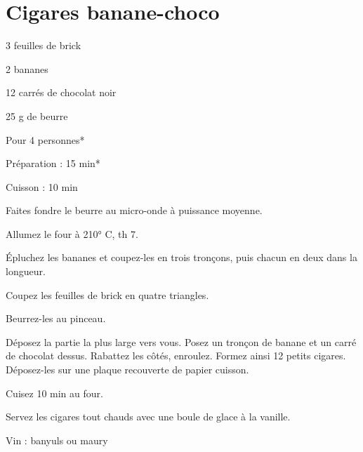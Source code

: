\section{Cigares banane-choco}

\begin{ingredients}
\item 3 feuilles de brick
\item 2 bananes
\item 12 carrés de chocolat noir
\item 25 g de beurre
\end{ingredients}
\begin{infos}
\item Pour 4 personnes*			%
\item Préparation : 15 min*		%
\item Cuisson : 10 min			%
\end{infos}
\begin{etapes}
\item Faites fondre le beurre au micro-onde à puissance moyenne. 
\item Allumez le four à 210° C, th 7.
\item Épluchez les bananes et coupez-les en trois tronçons, puis chacun en deux dans la longueur.
\item Coupez les feuilles de brick en quatre triangles. 
\item Beurrez-les au pinceau.
\item Déposez la partie la plus large vers vous. Posez un tronçon de banane et un carré de chocolat dessus. Rabattez les côtés, enroulez. Formez ainsi 12 petits cigares.
Déposez-les sur une plaque recouverte de papier cuisson. 
\item Cuisez 10 min au four.
\end{etapes}
\begin{conseils}
Servez les cigares tout chauds avec une boule de glace à la vanille.

Vin : banyuls ou maury

\end{conseils}